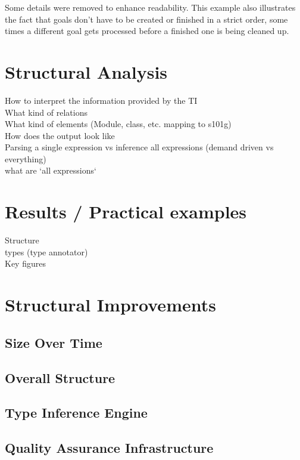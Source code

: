 \documentclass[12pt,halfparskip]{scrreprt}
\begin{document}
Some details were removed to enhance readability. This example also illustrates the fact that goals don't have to be created or finished in a strict order, some times a different goal gets processed before a finished one is being cleaned up.



\chapter{Structural Analysis}

How to interpret the information provided by the TI \\
What kind of relations \\
What kind of elements (Module, class, etc. mapping to s101g) \\
How does the output look like \\
Parsing a single expression vs inference all expressions (demand driven vs everything)\\
 what are `all expressions`

\chapter{Results / Practical examples}

Structure \\
types (type annotator)\\
Key figures



\chapter{Structural Improvements}
\section{Size Over Time}
\section{Overall Structure}
\section{Type Inference Engine}
\section{Quality Assurance Infrastructure}
\end{document}
